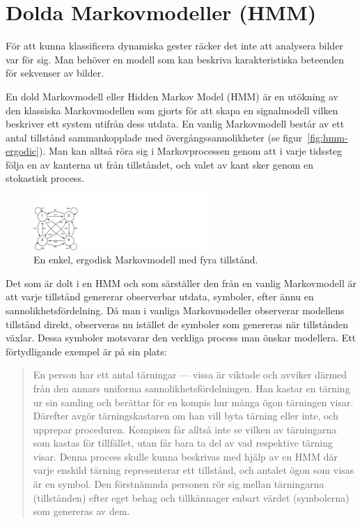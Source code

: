 \documentclass[../rapport_MVEX01-11-05]{subfiles}
\begin{document}
\section{Dolda Markovmodeller (HMM)}\label{sec:HMM}
För att kunna klassificera dynamiska gester räcker det inte att 
analysera bilder var för sig. Man behöver en modell som kan beskriva
karakteristiska beteenden för sekvenser av bilder.

En dold Markovmodell eller Hidden Markov Model (HMM) är en utökning
av den klassiska Markovmodellen som gjorts för att skapa en
signalmodell vilken beskriver ett system utifrån dess utdata.
En vanlig Markovmodell består av ett antal tillstånd sammankopplade
med övergångssannolikheter (se figur~\vref{fig:hmm-ergodic}). Man kan alltså
röra sig i Markovprocessen genom att i varje tidssteg följa en av kanterna
ut från tillståndet, och valet av kant sker genom en stokastisk process.

\begin{figure}[tb]
  \centering
  \includegraphics[width=0.6\textwidth,trim=0 0 935 80,clip=true]{bilder/ergodicHMM}
  \caption{En enkel, ergodisk Markovmodell med fyra tillstånd.}
  \label{fig:hmm-ergodic}
\end{figure}

Det som är dolt i en HMM och som särställer den från en vanlig Markovmodell
är att varje tillstånd genererar observerbar utdata, symboler, efter ännu en sannolikhetsfördelning. Då man i vanliga Markovmodeller
observerar modellens tillstånd direkt, observeras nu istället de
symboler som genereras när tillstånden växlar. Dessa symboler motsvarar
den verkliga process man önskar modellera. Ett förtydligande exempel
är på sin plats: 

\begin{quote}
En person har ett antal tärningar --- vissa är viktade och avviker därmed
från den annars uniforma sannolikhetsfördelningen.
Han kastar en tärning ur sin
samling och berättar för en kompis hur många ögon tärningen
visar. Därefter avgör tärningskastaren om han vill byta tärning eller
inte, och upprepar proceduren. Kompisen får alltså inte se vilken av
tärningarna som kastas för tillfället, utan får bara ta del av vad
respektive tärning visar. Denna process skulle kunna beskrivas med
hjälp av en HMM där varje enskild tärning representerar ett
tillstånd, och antalet ögon som visas är en symbol.
Den förstnämnda personen rör sig mellan tärningarna
(tillstånden) efter eget behag och tillkännager enbart värdet
(symbolerna) som genereras av dem. 
\end{quote}
\end{document}
